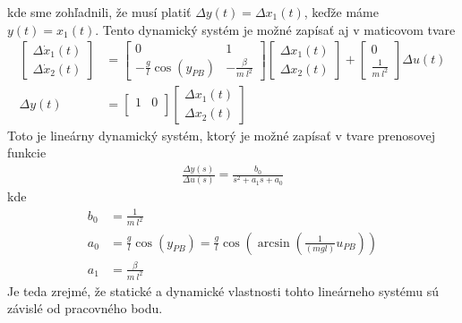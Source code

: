 \documentclass[a4paper, 10pt, ]{article}
\begin{document}
kde sme zohľadnili, že musí platiť $\Delta y(t) = \Delta x_1(t)$, keďže máme $y(t) = x_1(t)$. Tento dynamický systém je možné zapísať aj v maticovom tvare
\begin{subequations} \label{stavoplinkyv}
    \begin{align}
    	\begin{bmatrix}
        	  \Delta \dot x_1(t) \\
    		  \Delta \dot x_2(t)
     	\end{bmatrix}
    	&=
    	\begin{bmatrix}
        	0 & 1 \\
        	- \frac{g}{l} \cos \left( y_{PB} \right) & - \frac{\beta}{m\ l^2}
      	\end{bmatrix}
        \begin{bmatrix}
        	  \Delta x_1(t) \\
    		  \Delta x_2(t)
     	\end{bmatrix}
        +
        \begin{bmatrix}
        	  0 \\
    		  \frac{1}{m\ l^2}
     	\end{bmatrix}
        \Delta u(t)
        \\
        \Delta y(t)
        &=
        \begin{bmatrix}
            1 & 0 \\
        \end{bmatrix}
        \begin{bmatrix}
              \Delta x_1(t) \\
              \Delta x_2(t)
        \end{bmatrix}
    \end{align}
\end{subequations}
Toto je lineárny dynamický systém, ktorý je možné zapísať v tvare prenosovej funkcie
\begin{align}
    \frac{\Delta y(s)}{\Delta u(s)} = \frac{b_0}{s^2 + a_1 s + a_0}
\end{align}
kde
\begin{subequations}
    \begin{align}
        b_0 &= \frac{1}{m\ l^2} \\
        a_0 &= \frac{g}{l} \cos \left( y_{PB} \right) = \frac{g}{l} \cos \left( \arcsin \left( \frac{1}{ \left(m g l\right)} u_{PB} \right) \right) \\
        a_1 &= \frac{\beta}{m\ l^2}
    \end{align}
\end{subequations}
Je teda zrejmé, že statické a dynamické vlastnosti tohto lineárneho systému sú závislé od pracovného bodu.
\end{document}
